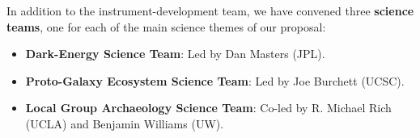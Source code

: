 \documentclass[oneside,11pt]{amsart}
\begin{document}
\noindent In addition to the instrument-development team, we have
convened three {\bf science teams}, one for each of the main science
themes of our proposal:
%
\begin{itemize}
%
\item {\bf Dark-Energy Science Team}: Led by Dan Masters (JPL).\\[-5pt]
%
\item {\bf Proto-Galaxy Ecosystem Science Team}: Led by Joe Burchett
(UCSC).\\[-5pt]
%
\item {\bf Local Group Archaeology Science Team}: Co-led by R. Michael
Rich (UCLA) and Benjamin Williams (UW).
%
\end{itemize}



\end{document}
